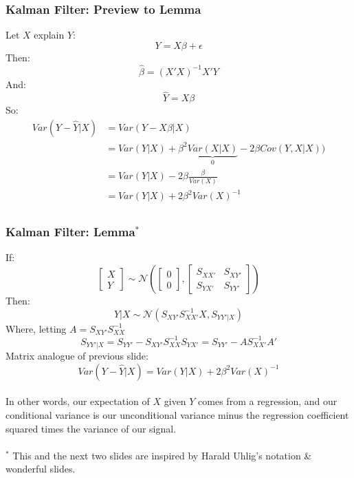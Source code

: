 \documentclass{beamer}
\begin{document}
\begin{frame}
\frametitle[alignment=center]{Kalman Filter: Preview to Lemma}
Let $X$ explain $Y$:
$$Y=X\beta+\epsilon$$
Then:
$$\hat{\beta}=(X'X)^{-1}X'Y$$
And:
$$\hat{Y}=X\beta$$
So:
\begin{align*}
Var(Y-\hat{Y}|X) & =Var(Y-X\beta|X)\\
 & =Var(Y|X)+\beta^2\underbrace{Var(X|X)}_{0}-2\beta Cov(Y, X|X))\\
  & =Var(Y|X)-2\beta \frac{\beta}{Var(X)}\\
  & =Var(Y|X)+2\beta^2 Var(X)^{-1}\\
\end{align*}
\end{frame}

\begin{frame}
\frametitle[alignment=center]{Kalman Filter: Lemma$^*$}
If:
$$\left[\begin{array}{c}X \\ Y\end{array}\right]\sim\mathcal{N}\left(\left[\begin{array}{c}0 \\ 0\end{array}\right],\left[\begin{array}{cc}S_{XX'}  & S_{XY'} \\ S_{YX'} & S_{YY'}\end{array}\right]\right)$$
Then:
$$Y|X\sim\mathcal{N}\left(S_{XY'}S_{XX'}^{-1}X,S_{YY'|X}\right)$$
Where, letting $A=S_{XY'}S_{XX}^{-1}$
$$S_{YY'|X}=S_{YY'}-S_{XY'}S_{XX}^{-1}S_{YX'}=S_{YY'}-AS_{XX'}^{-1}A'$$
Matrix analogue of previous slide:
$$Var(Y-\hat{Y}|X)=Var(Y|X)+2\beta^2 Var(X)^{-1}$$
\ \\
In other words, our expectation of $X$ given $Y$ comes from a regression, and our conditional variance is our unconditional variance minus the regression coefficient squared times the variance of our signal.
\ \\
\footnotesize
\ \\
$^*$ This and the next two slides are inspired by Harald Uhlig's notation \& wonderful slides.
\end{frame}
\end{document}
